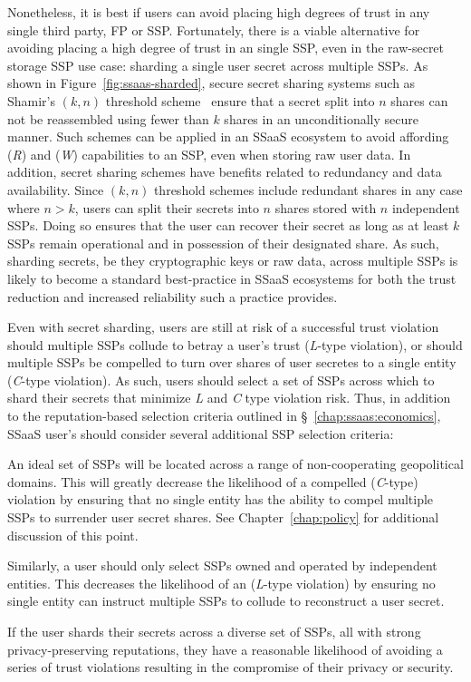 Nonetheless, it is best if users can avoid placing high degrees of
trust in any single third party, FP or SSP. Fortunately, there is a
viable alternative for avoiding placing a high degree of trust in an
single SSP, even in the raw-secret storage SSP use case: sharding a
single user secret across multiple SSPs. As shown in
Figure~\ref{fig:ssaas-sharded}, secure secret sharing systems such as
Shamir's $(k, n)$ threshold scheme~\cite{shamir1979} ensure that a
secret split into $n$ shares can not be reassembled using fewer than
$k$ shares in an unconditionally secure manner. Such schemes can be
applied in an SSaaS ecosystem to avoid affording (\emph{R}) and
(\emph{W}) capabilities to an SSP, even when storing raw user data. In
addition, secret sharing schemes have benefits related to redundancy
and data availability. Since $(k, n)$ threshold schemes include
redundant shares in any case where $n > k$, users can split their
secrets into $n$ shares stored with $n$ independent SSPs. Doing so
ensures that the user can recover their secret as long as at least $k$
SSPs remain operational and in possession of their designated
share. As such, sharding secrets, be they cryptographic keys or raw
data, across multiple SSPs is likely to become a standard
best-practice in SSaaS ecosystems for both the trust reduction and
increased reliability such a practice provides.

Even with secret sharding, users are still at risk of a successful
trust violation should multiple SSPs collude to betray a user's trust
(\emph{L}-type violation), or should multiple SSPs be compelled to
turn over shares of user secretes to a single entity (\emph{C}-type
violation). As such, users should select a set of SSPs across which to
shard their secrets that minimize \emph{L} and \emph{C} type violation
risk. Thus, in addition to the reputation-based selection criteria
outlined in \S~\ref{chap:ssaas:economics}, SSaaS user's should
consider several additional SSP selection criteria:

\begin{packed_desc}
\item[Geopolitical Diversity:] An ideal set of SSPs will be located
  across a range of non-cooperating geopolitical domains. This will
  greatly decrease the likelihood of a compelled (\emph{C}-type)
  violation by ensuring that no single entity has the ability to
  compel multiple SSPs to surrender user secret shares. See
  Chapter~\ref{chap:policy} for additional discussion of this point.
\item[Ownership Diversity:] Similarly, a user should only select SSPs
  owned and operated by independent entities. This decreases the
  likelihood of an (\emph{L}-type violation) by ensuring no single
  entity can instruct multiple SSPs to collude to reconstruct a user
  secret.
\end{packed_desc}

If the user shards their secrets across a diverse set of SSPs, all
with strong privacy-preserving reputations, they have a reasonable
likelihood of avoiding a series of trust violations resulting in the
compromise of their privacy or security.

